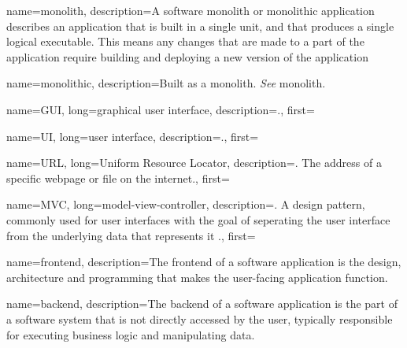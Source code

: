 

{name=monolith, description={A software monolith or monolithic application
    describes an application that is built in a single unit, and that produces a
    single logical executable. This means any changes that are made to a part of
    the application require building and deploying a new version of the
    application \autocite{Fowler_Microservices_2014}}
}

{
    name=monolithic,
    description={Built as a monolith. \textit{See} \gls{monolith}.}
}

{
    name=GUI,
    long={graphical user interface},
    description={.},
    first=
}

{
    name=UI,
    long={user interface},
    description={.},
    first=
}

{
    name=URL,
    long={Uniform Resource Locator},
    description={. The address of a specific webpage or file on
    the internet.},
    first=
}

{
    name=MVC, 
    long={model-view-controller}, 
    description={. A design pattern, commonly used for user
    interfaces with the goal of seperating the user interface from the
    underlying data that represents it \autocite{Leff_Raylfield_2001}.}, 
    first=
}

{
    name=frontend, 
    description={The frontend of a software application is the design,
    architecture and programming that makes the user-facing application
    function. } 
}

{
    name=backend, 
    description={The backend of a software application is the part of a software
    system that is not directly accessed by the user, typically responsible for
    executing business logic and manipulating data.}
}

